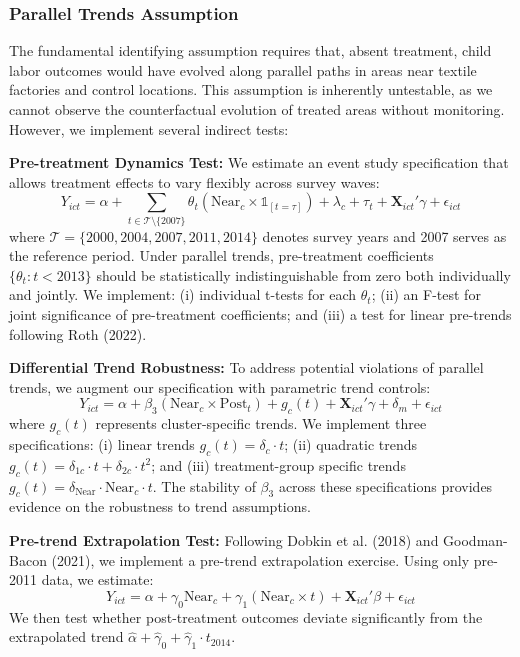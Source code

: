 \documentclass[12pt]{article}
\begin{document}
\subsubsection{Parallel Trends Assumption}

The fundamental identifying assumption requires that, absent treatment, child labor outcomes would have evolved along parallel paths in areas near textile factories and control locations. This assumption is inherently untestable, as we cannot observe the counterfactual evolution of treated areas without monitoring. However, we implement several indirect tests:

\textbf{Pre-treatment Dynamics Test:} We estimate an event study specification that allows treatment effects to vary flexibly across survey waves:
\begin{equation}
Y_{ict} = \alpha + \sum_{t \in \mathcal{T} \setminus \{2007\}} \theta_t (\text{Near}_c \times \mathbb{1}_{[t=\tau]}) + \lambda_c + \tau_t + \mathbf{X}_{ict}'\gamma + \epsilon_{ict}
\end{equation}
where $\mathcal{T} = \{2000, 2004, 2007, 2011, 2014\}$ denotes survey years and 2007 serves as the reference period. Under parallel trends, pre-treatment coefficients $\{\theta_t : t < 2013\}$ should be statistically indistinguishable from zero both individually and jointly. We implement: (i) individual t-tests for each $\theta_t$; (ii) an F-test for joint significance of pre-treatment coefficients; and (iii) a test for linear pre-trends following Roth (2022).

\textbf{Differential Trend Robustness:} To address potential violations of parallel trends, we augment our specification with parametric trend controls:
\begin{equation}
Y_{ict} = \alpha + \beta_3(\text{Near}_c \times \text{Post}_t) + g_c(t) + \mathbf{X}_{ict}'\gamma + \delta_m + \epsilon_{ict}
\end{equation}
where $g_c(t)$ represents cluster-specific trends. We implement three specifications: (i) linear trends $g_c(t) = \delta_c \cdot t$; (ii) quadratic trends $g_c(t) = \delta_{1c} \cdot t + \delta_{2c} \cdot t^2$; and (iii) treatment-group specific trends $g_c(t) = \delta_{\text{Near}} \cdot \text{Near}_c \cdot t$. The stability of $\beta_3$ across these specifications provides evidence on the robustness to trend assumptions.

\textbf{Pre-trend Extrapolation Test:} Following Dobkin et al. (2018) and Goodman-Bacon (2021), we implement a pre-trend extrapolation exercise. Using only pre-2011 data, we estimate:
\begin{equation}
Y_{ict} = \alpha + \gamma_0 \text{Near}_c + \gamma_1 (\text{Near}_c \times t) + \mathbf{X}_{ict}'\beta + \epsilon_{ict}
\end{equation}
We then test whether post-treatment outcomes deviate significantly from the extrapolated trend $\hat{\alpha} + \hat{\gamma}_0 + \hat{\gamma}_1 \cdot t_{2014}$.
\end{document}
